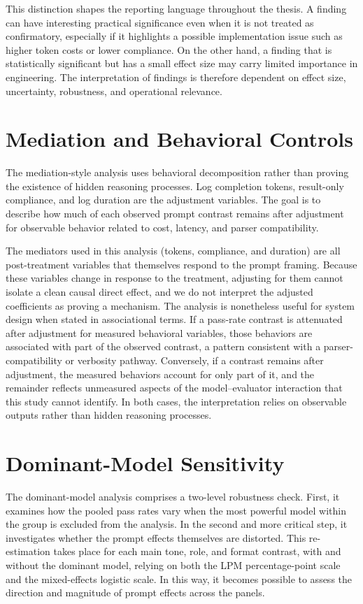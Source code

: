 This distinction shapes the reporting language throughout the thesis. A finding can have interesting practical significance even when it is not treated as confirmatory, especially if it highlights a possible implementation issue such as higher token costs or lower compliance. On the other hand, a finding that is statistically significant but has a small effect size may carry limited importance in engineering. The interpretation of findings is therefore dependent on effect size, uncertainty, robustness, and operational relevance.

\section{Mediation and Behavioral Controls}

The mediation-style analysis uses behavioral decomposition rather than proving the existence of hidden reasoning processes. Log completion tokens, result-only compliance, and log duration are the adjustment variables. The goal is to describe how much of each observed prompt contrast remains after adjustment for observable behavior related to cost, latency, and parser compatibility.

The mediators used in this analysis (tokens, compliance, and duration) are all post-treatment variables that themselves respond to the prompt framing. Because these variables change in response to the treatment, adjusting for them cannot isolate a clean causal direct effect, and we do not interpret the adjusted coefficients as proving a mechanism. The analysis is nonetheless useful for system design when stated in associational terms. If a pass-rate contrast is attenuated after adjustment for measured behavioral variables, those behaviors are associated with part of the observed contrast, a pattern consistent with a parser-compatibility or verbosity pathway. Conversely, if a contrast remains after adjustment, the measured behaviors account for only part of it, and the remainder reflects unmeasured aspects of the model--evaluator interaction that this study cannot identify. In both cases, the interpretation relies on observable outputs rather than hidden reasoning processes.

\section{Dominant-Model Sensitivity}

The dominant-model analysis comprises a two-level robustness check. First, it examines how the pooled pass rates vary when the most powerful model within the group is excluded from the analysis. In the second and more critical step, it investigates whether the prompt effects themselves are distorted. This re-estimation takes place for each main tone, role, and format contrast, with and without the dominant model, relying on both the LPM percentage-point scale and the mixed-effects logistic scale. In this way, it becomes possible to assess the direction and magnitude of prompt effects across the panels.

